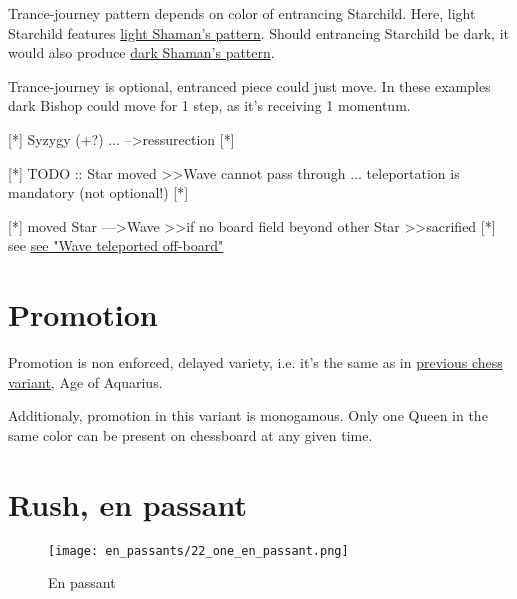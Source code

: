 Trance-journey pattern depends on color of entrancing Starchild. Here, light Starchild features
\hyperref[fig:scn_cot_14_light_shaman_trance_journey]{light Shaman's pattern}. Should entrancing
Starchild be dark, it would also produce
\hyperref[fig:scn_cot_16_dark_shaman_trance_journey]{dark Shaman's pattern}.

Trance-journey is optional, entranced piece could just move. In these examples dark Bishop could
move for 1 step, as it's receiving 1 momentum.


\clearpage %

[*] Syzygy (+?) ... --\textgreater ressurection [*]

[*] TODO :: Star moved \textgreater\textgreater Wave cannot pass through ... teleportation is mandatory (not optional!) [*]

[*] moved Star ---\textgreater Wave \textgreater\textgreater if no board field beyond other Star \textgreater\textgreater sacrified [*]
see \hyperref[fig:scn_d_11_wave_teleported_off_board]{see "Wave teleported off-board"}

\clearpage %

\section*{Promotion}

Promotion is non enforced, delayed variety, i.e. it's the same as in
\hyperref[sec:Age of Aquarius/Promotion]{previous chess variant}, Age of Aquarius.

Additionaly, promotion in this variant is monogamous.
Only one Queen in the same color can be present on chessboard at any given time.

\clearpage %

\section*{Rush, en passant}

\vspace*{-1.2\baselineskip}
\noindent
\begin{figure}[!h]
\texttt{[image: en\_passants/22\_one\_en\_passant.png]}
\caption{En passant}
\label{fig:22_one_en_passant}
\end{figure}

